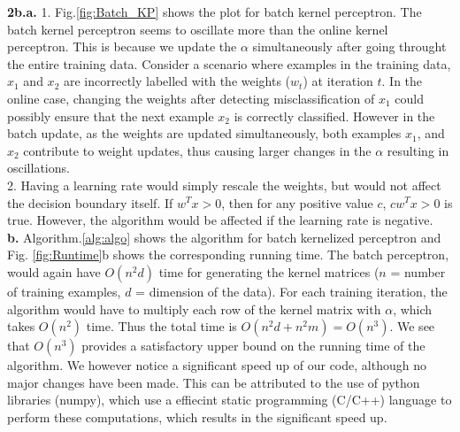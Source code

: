\documentclass{article}
\begin{document}
\textbf{2b.a.} 1. Fig.\ref{fig:Batch_KP} shows the plot for batch kernel perceptron. The batch kernel perceptron seems to oscillate more than the online kernel perceptron. This is because we update the $\alpha$ simultaneously after going throught the entire training data. Consider a scenario where examples in the training data, $x_{1}$ and $x_{2}$ are incorrectly labelled with the weights ($w_{t}$) at iteration $t$. In the online case, changing the weights after detecting misclassification of $x_{1}$ could possibly ensure that the next example $x_{2}$ is correctly classified. However in the batch update, as the weights are updated simultaneously, both examples $x_{1}$, and $x_{2}$ contribute to weight updates, thus causing larger changes in the $\alpha$ resulting in oscillations.\\

2. Having a learning rate would simply rescale the weights, but would not affect the decision boundary itself. If $w^{T}x > 0$, then for any positive value $c$, $cw^{T}x > 0$ is true. However, the algorithm would be affected if the learning rate is negative. \\

\textbf{b.} Algorithm.\ref{alg:algo} shows the algorithm for batch kernelized perceptron and Fig. \ref{fig:Runtime}b shows the corresponding running time. The batch perceptron, would again have $O(n^{2}d)$ time for generating the kernel matrices ($n$ = number of training examples, $d$ = dimension of the data). For each training iteration, the algorithm would have to multiply each row of the kernel matrix with $\alpha$, which takes $O(n^{2})$ time. Thus the total time is $O(n^{2}d + n^{2}m) = O(n^{3})$. We see that $O(n^{3})$ provides a satisfactory upper bound on the running time of the algorithm. We however notice a significant speed up of our code, although no major changes have been made. This can be attributed to the use of python libraries (numpy), which use a effiecint static programming (C/C++) language to perform these computations, which results in the significant speed up.\\
\end{document}
